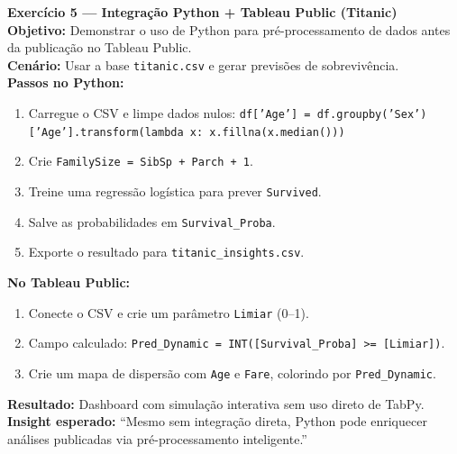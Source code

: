 \begin{SolvedBox}
\textbf{Exercício 5 — Integração Python + Tableau Public (Titanic)}\\[4pt]
\textbf{Objetivo:} Demonstrar o uso de Python para pré-processamento de dados antes da publicação no Tableau Public.\\[4pt]
\textbf{Cenário:} Usar a base \texttt{titanic.csv} e gerar previsões de sobrevivência.\\[4pt]
\textbf{Passos no Python:}
\begin{enumerate}[leftmargin=*]
  \item Carregue o CSV e limpe dados nulos:  
  \texttt{df['Age'] = df.groupby('Sex')['Age'].transform(lambda x: x.fillna(x.median()))}
  \item Crie \texttt{FamilySize = SibSp + Parch + 1}.
  \item Treine uma regressão logística para prever \texttt{Survived}.
  \item Salve as probabilidades em \texttt{Survival_Proba}.
  \item Exporte o resultado para \texttt{titanic\_insights.csv}.
\end{enumerate}
\textbf{No Tableau Public:}
\begin{enumerate}[leftmargin=*]
  \item Conecte o CSV e crie um parâmetro \texttt{Limiar} (0–1).
  \item Campo calculado: \texttt{Pred_Dynamic = INT([Survival_Proba] >= [Limiar])}.
  \item Crie um mapa de dispersão com \texttt{Age} e \texttt{Fare}, colorindo por \texttt{Pred_Dynamic}.
\end{enumerate}
\textbf{Resultado:} Dashboard com simulação interativa sem uso direto de TabPy.\\
\textbf{Insight esperado:} “Mesmo sem integração direta, Python pode enriquecer análises publicadas via pré-processamento inteligente.”
\end{SolvedBox}




